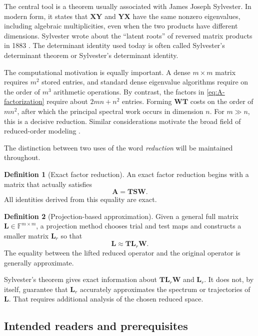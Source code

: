 \documentclass[11pt]{article}
\newcommand{\F}{\mathbb{F}}
\newcommand{\mat}[1]{\mathbf{#1}}
\theoremstyle{definition}
\newtheorem{definition}[definition]{Definition}
\theoremstyle{remark}
\begin{document}
The central tool is a theorem usually associated with James Joseph Sylvester. In modern form, it states that \(\mat{X}\mat{Y}\) and \(\mat{Y}\mat{X}\) have the same nonzero eigenvalues, including algebraic multiplicities, even when the two products have different dimensions. Sylvester wrote about the ``latent roots'' of reversed matrix products in 1883 \parencite{sylvester1883equation}. The determinant identity used today is often called Sylvester's determinant theorem or Sylvester's determinant identity.

The computational motivation is equally important. A dense \(m\times m\) matrix requires \(m^2\) stored entries, and standard dense eigenvalue algorithms require on the order of \(m^3\) arithmetic operations. By contrast, the factors in \cref{eq:A-factorization} require about \(2mn+n^2\) entries. Forming \(\mat{W}\mat{T}\) costs on the order of \(mn^2\), after which the principal spectral work occurs in dimension \(n\). For \(m\gg n\), this is a decisive reduction. Similar considerations motivate the broad field of reduced-order modeling \parencite{antoulas2005approximation,benner2015survey,quarteroni2016reduced}.

The distinction between two uses of the word \emph{reduction} will be maintained throughout.

\begin{definition}[Exact factor reduction]
An exact factor reduction begins with a matrix that actually satisfies
\[
  \mat{A}=\mat{T}\mat{S}\mat{W}.
\]
All identities derived from this equality are exact.
\end{definition}

\begin{definition}[Projection-based approximation]
Given a general full matrix \(\mat{L}\in\F^{m\times m}\), a projection method chooses trial and test maps and constructs a smaller matrix \(\mat{L}_r\) so that
\[
  \mat{L}\approx \mat{T}\mat{L}_r\mat{W}.
\]
The equality between the lifted reduced operator and the original operator is generally approximate.
\end{definition}

Sylvester's theorem gives exact information about \(\mat{T}\mat{L}_r\mat{W}\) and \(\mat{L}_r\). It does not, by itself, guarantee that \(\mat{L}_r\) accurately approximates the spectrum or trajectories of \(\mat{L}\). That requires additional analysis of the chosen reduced space.

\subsection*{Intended readers and prerequisites}
\end{document}
